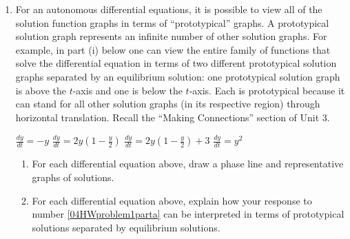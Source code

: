 
\begin{enumerate}
\item For an autonomous differential equations, it is possible to view all of the solution function graphs in terms of ``prototypical'' graphs. A prototypical solution graph represents an infinite number of other solution graphs. For example, in part (i) below one can view the entire family of functions that solve the differential equation in terms of two different prototypical solution graphs separated by an equilibrium solution: one prototypical solution graph is above the $t$-axis and one is below the $t$-axis. Each is prototypical because it can stand for all other solution graphs (in its respective region) through horizontal translation. Recall the ``Making Connections'' section of Unit 3. \label{04HWproblem1}
\begin{hnumerate}
\hitem    $\displaystyle\frac{dy}{dt}=-y$    \hitem $\displaystyle\frac{dy}{dt}=2y\left(1-\frac{y}{2}\right)$        \hitem $\displaystyle\frac{dy}{dt}=2y\left(1-\frac{y}{2}\right)+3$        \hitem   $\displaystyle\frac{dy}{dt}=y^2$ \end{hnumerate}
\begin{enumerate}
\item For each differential equation above, draw a phase line and representative graphs of solutions. \label{04HWproblem1parta}
\item For each differential equation above, explain how your response to number \ref{04HWproblem1parta} can be interpreted in terms of prototypical solutions separated by equilibrium solutions. \label{04HWproblem1partb} 
\end{enumerate}


\end{enumerate}

